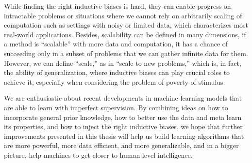 While finding the right inductive biases is hard, they can enable progress on intractable problems or situations where we cannot rely on arbitrarily scaling of computation such as settings with noisy or limited data, which characterizes most real-world applications. 
Besides, scalability can be defined in many dimensions, if a method is ``scalable'' with more data and computation, it has a chance of succeeding only in a subset of problems that we can gather infinite data for them. 
However, we can define ``scale,'' as in ``scale to new problems,'' which is, in fact, the ability of generalization, where inductive biases can play crucial roles to achieve it, especially when considering the problem of poverty of stimulus.


\bigskip
We are enthusiastic about recent developments in machine learning models that are able to learn with imperfect supervision. 
By combining ideas on how to incorporate general prior knowledge, how to better use the data and meta learn its properties, and how to inject the right inductive biases, we hope that further improvements presented in this thesis will help us build learning algorithms that are more powerful, more data efficient, and more generalizable, and in a bigger picture, help machines to get closer to human-level intelligence. 
